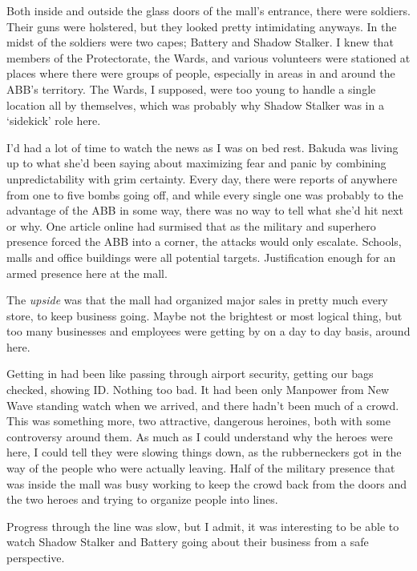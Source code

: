 Both inside and outside the glass doors of the mall's entrance, there were soldiers.  Their guns were holstered, but they looked pretty intimidating anyways.  In the midst of the soldiers were two capes; Battery and Shadow Stalker.  I knew that members of the Protectorate, the Wards, and various volunteers were stationed at places where there were groups of people, especially in areas in and around the ABB's territory.  The Wards, I supposed, were too young to handle a single location all by themselves, which was probably why Shadow Stalker was in a `sidekick' role here.



I'd had a lot of time to watch the news as I was on bed rest.  Bakuda was living up to what she'd been saying about maximizing fear and panic by combining unpredictability with grim certainty.  Every day, there were reports of anywhere from one to five bombs going off, and while every single one was probably to the advantage of the ABB in some way, there was no way to tell what she'd hit next or why.  One article online had surmised that as the military and superhero presence forced the ABB into a corner, the attacks would only escalate.  Schools, malls and office buildings were all potential targets.  Justification enough for an armed presence here at the mall.



The \emph{upside} was that the mall had organized major sales in pretty much every store, to keep business going.  Maybe not the brightest or most logical thing, but too many businesses and employees were getting by on a day to day basis, around here.



Getting in had been like passing through airport security, getting our bags checked, showing ID.  Nothing too bad.  It had been only Manpower from New Wave standing watch when we arrived, and there hadn't been much of a crowd.  This was something more, two attractive, dangerous heroines, both with some controversy around them.  As much as I could understand why the heroes were here, I could tell they were slowing things down, as the rubberneckers got in the way of the people who were actually leaving.  Half of the military presence that was inside the mall was busy working to keep the crowd back from the doors and the two heroes and trying to organize people into lines.



Progress through the line was slow, but I admit, it was interesting to be able to watch Shadow Stalker and Battery going about their business from a safe perspective.



